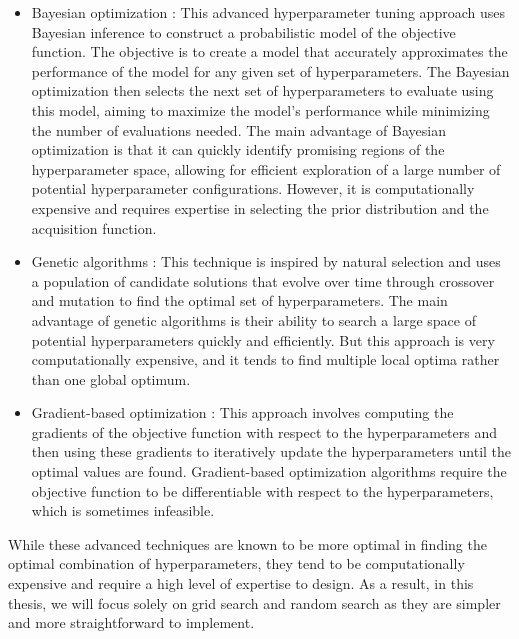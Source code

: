 \begin{itemize}
\item Bayesian optimization \cite{frazier2018tutorial}: This advanced hyperparameter tuning approach uses Bayesian inference to construct a probabilistic model of the objective function. The objective is to create a model that accurately approximates the performance of the model for any given set of hyperparameters. The Bayesian optimization then selects the next set of hyperparameters to evaluate using this model, aiming to maximize the model's performance while minimizing the number of evaluations needed. The main advantage of Bayesian optimization is that it can quickly identify promising regions of the hyperparameter space, allowing for efficient exploration of a large number of potential hyperparameter configurations. However, it is computationally expensive and requires expertise in selecting the prior distribution and the acquisition function. 
\item Genetic algorithms \cite{orive2014evolutionary} \cite{aszemi2019hyperparameter}: This technique is inspired by natural selection and uses a population of candidate solutions that evolve over time through crossover and mutation to find the optimal set of hyperparameters. The main advantage of genetic algorithms is their ability to search a large space of potential hyperparameters quickly and efficiently. But this approach is very computationally expensive, and it tends to find multiple local optima rather than one global optimum.
\item Gradient-based optimization \cite{bengio2000gradient}: This approach involves computing the gradients of the objective function with respect to the hyperparameters and then using these gradients to iteratively update the hyperparameters until the optimal values are found. Gradient-based optimization algorithms require the objective function to be differentiable with respect to the hyperparameters, which is sometimes infeasible.
\end{itemize}

While these advanced techniques  are known to be more optimal in finding the optimal combination of hyperparameters, they tend to be computationally expensive and require a high level of expertise to design. As a result, in this thesis, we will focus solely on grid search and random search as they are simpler and more straightforward to implement.
